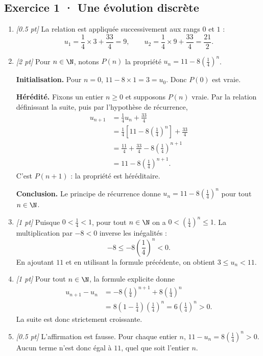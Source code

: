 \subsection*{Exercice 1 · Une évolution discrète}\begin{enumerate}

\item \textit{[\num{0,5} pt]} La relation est appliquée successivement aux rangs $0$ et $1$ :\[u_1=\frac{1}{4}\times 3+\frac{33}{4}=9,\qquad u_2=\frac{1}{4}\times 9+\frac{33}{4}=\frac{21}{2}.\]

\item \textit{[2 pt]} Pour $n\in\N$, notons $P(n)$ la propriété $u_n=11-8\left(\frac{1}{4}\right)^n$.
\par\smallskip\textbf{Initialisation.} Pour $n=0$, $11-8\times1=3=u_0$. Donc $P(0)$ est vraie.
\par\smallskip\textbf{Hérédité.} Fixons un entier $n\ge0$ et supposons $P(n)$ vraie. Par la relation définissant la suite, puis par l'hypothèse de récurrence,
\[\begin{aligned}u_{n+1}&=\frac{1}{4}u_n+\frac{33}{4}\\
&=\frac{1}{4}\left[11-8\left(\frac{1}{4}\right)^n\right]+\frac{33}{4}\\
&=\frac{11}{4}+\frac{33}{4}-8\left(\frac{1}{4}\right)^{n+1}\\
&=11-8\left(\frac{1}{4}\right)^{n+1}.
\end{aligned}\]
C'est $P(n+1)$ : la propriété est héréditaire.
\par\smallskip\textbf{Conclusion.} Le principe de récurrence donne $u_n=11-8\left(\frac{1}{4}\right)^n$ pour tout $n\in\N$.

\item \textit{[1 pt]} Puisque $0<\frac{1}{4}<1$, pour tout $n\in\N$ on a $0<(\frac{1}{4})^n\le1$. La multiplication par $-8<0$ inverse les inégalités :
\[-8\le-8(\frac{1}{4})^n<0.\]
En ajoutant $11$ et en utilisant la formule précédente, on obtient $3\le u_n<11$.

\item \textit{[1 pt]} Pour tout $n\in\N$, la formule explicite donne
\[\begin{aligned}u_{n+1}-u_n&=-8(\frac{1}{4})^{n+1}+8(\frac{1}{4})^n\\&=8(1-\frac{1}{4})(\frac{1}{4})^n=6(\frac{1}{4})^n>0.\end{aligned}\]
La suite est donc strictement croissante.

\item \textit{[\num{0,5} pt]} L'affirmation est fausse. Pour chaque entier $n$, $11-u_n=8(\frac{1}{4})^n>0$. Aucun terme n'est donc égal à $11$, quel que soit l'entier $n$.

\end{enumerate}

